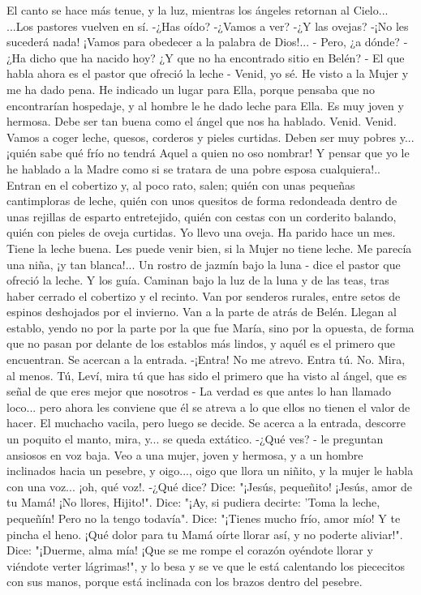 \documentclass[12pt]{book} %
\begin{document}
El canto se hace más tenue, y la luz, mientras los ángeles retornan al Cielo... ...Los pastores vuelven en sí. 
-¿Has oído? 
-¿Vamos a ver? 
-¿Y las ovejas? 
-¡No les sucederá nada! ¡Vamos para obedecer a la palabra de Dios!... - Pero, ¿a dónde? 
-¿Ha dicho que ha nacido hoy? ¿Y que no ha encontrado sitio en Belén? - El que habla ahora es el pastor que ofreció la 
leche - Venid, yo sé. He visto a la Mujer y me ha dado pena. He indicado un lugar para Ella, porque pensaba que no encontrarían hospedaje, y al hombre le he dado leche para Ella. Es muy joven y hermosa. Debe ser tan buena como el ángel que nos ha hablado. Venid. Venid. Vamos a coger leche, quesos, corderos y pieles curtidas. Deben ser muy pobres y... ¡quién sabe qué frío no tendrá Aquel a quien no oso nombrar! Y pensar que yo le he hablado a la Madre como si se tratara de una pobre esposa cualquiera!.. 
Entran en el cobertizo y, al poco rato, salen; quién con unas pequeñas cantimploras de leche, quién con unos quesitos 
de forma redondeada dentro de unas rejillas de esparto entretejido, quién con cestas con un corderito balando, quién con pieles de oveja curtidas. 
Yo llevo una oveja. Ha parido hace un mes. Tiene la leche buena. Les puede venir bien, si la Mujer no tiene leche. Me 
parecía una niña, ¡y tan blanca!... Un rostro de jazmín bajo la luna - dice el pastor que ofreció la leche. Y los guía. 
Caminan bajo la luz de la luna y de las teas, tras haber cerrado el cobertizo y el recinto. Van por senderos rurales, entre 
setos de espinos deshojados por el invierno. 
Van a la parte de atrás de Belén. Llegan al establo, yendo no por la parte por la que fue María, sino por la opuesta, de 
forma que no pasan por delante de los establos más lindos, y aquél es el primero que encuentran. Se acercan a la entrada. -¡Entra! 
No me atrevo. 
Entra tú. 
No. 
Mira, al menos. 
Tú, Leví, mira tú que has sido el primero que ha visto al ángel, que es señal de que eres mejor que nosotros - La verdad 
es que antes lo han llamado loco... pero ahora les conviene que él se atreva a lo que ellos no tienen el valor de hacer. 
El muchacho vacila, pero luego se decide. Se acerca a la entrada, descorre un poquito el manto, mira, y... se queda 
extático. 
-¿Qué ves? - le preguntan ansiosos en voz baja. 
Veo a una mujer, joven y hermosa, y a un hombre inclinados hacia un pesebre, y oigo..., oigo que llora un niñito, y la 
mujer le habla con una voz... ¡oh, qué voz!. 
-¿Qué dice? 
Dice: "¡Jesús, pequeñito! ¡Jesús, amor de tu Mamá! ¡No llores, Hijito!". Dice: "¡Ay, si pudiera decirte: 'Toma la leche, pequeñín! Pero no la tengo todavía". Dice: "¡Tienes mucho frío, amor mío! Y te pincha el heno. ¡Qué dolor para tu Mamá oírte llorar así, y no poderte aliviar!". Dice: "¡Duerme, alma mía! ¡Que se me rompe el corazón oyéndote llorar y viéndote verter lágrimas!", y lo besa y se ve que le está calentando los piececitos con sus manos, porque está inclinada con los brazos dentro del pesebre. 
\end{document}

